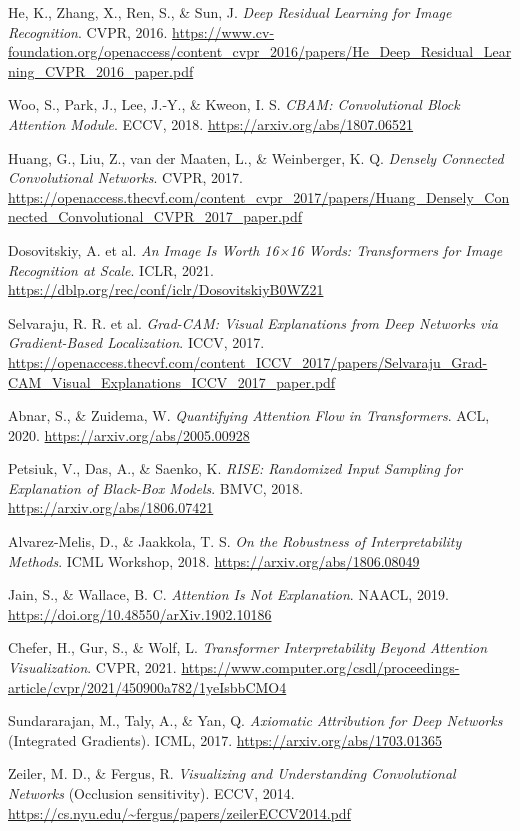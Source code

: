 \documentclass[11pt,a4paper]{article}
\begin{document}
\begin{list}{}{\setlength{\leftmargin}{2.5em}\setlength{\labelwidth}{2em}\setlength{\labelsep}{0.3em}\setlength{\itemsep}{0.2ex}}
\item[1.] He, K., Zhang, X., Ren, S., \& Sun, J. \emph{Deep Residual Learning for Image Recognition}. CVPR, 2016. \url{https://www.cv-foundation.org/openaccess/content_cvpr_2016/papers/He_Deep_Residual_Learning_CVPR_2016_paper.pdf}
\item[2.] Woo, S., Park, J., Lee, J.-Y., \& Kweon, I. S. \emph{CBAM: Convolutional Block Attention Module}. ECCV, 2018. \url{https://arxiv.org/abs/1807.06521}
\item[3.] Huang, G., Liu, Z., van der Maaten, L., \& Weinberger, K. Q. \emph{Densely Connected Convolutional Networks}. CVPR, 2017. \url{https://openaccess.thecvf.com/content_cvpr_2017/papers/Huang_Densely_Connected_Convolutional_CVPR_2017_paper.pdf}
\item[4.] Dosovitskiy, A. et al. \emph{An Image Is Worth 16×16 Words: Transformers for Image Recognition at Scale}. ICLR, 2021. \url{https://dblp.org/rec/conf/iclr/DosovitskiyB0WZ21}
\item[5.] Selvaraju, R. R. et al. \emph{Grad-CAM: Visual Explanations from Deep Networks via Gradient-Based Localization}. ICCV, 2017. \url{https://openaccess.thecvf.com/content_ICCV_2017/papers/Selvaraju_Grad-CAM_Visual_Explanations_ICCV_2017_paper.pdf}
\item[6.] Abnar, S., \& Zuidema, W. \emph{Quantifying Attention Flow in Transformers}. ACL, 2020. \url{https://arxiv.org/abs/2005.00928}
\item[7.] Petsiuk, V., Das, A., \& Saenko, K. \emph{RISE: Randomized Input Sampling for Explanation of Black-Box Models}. BMVC, 2018. \url{https://arxiv.org/abs/1806.07421}
\item[8.] Alvarez-Melis, D., \& Jaakkola, T. S. \emph{On the Robustness of Interpretability Methods}. ICML Workshop, 2018. \url{https://arxiv.org/abs/1806.08049}
\item[9.] Jain, S., \& Wallace, B. C. \emph{Attention Is Not Explanation}. NAACL, 2019. \url{https://doi.org/10.48550/arXiv.1902.10186}
\item[10.] Chefer, H., Gur, S., \& Wolf, L. \emph{Transformer Interpretability Beyond Attention Visualization}. CVPR, 2021. \url{https://www.computer.org/csdl/proceedings-article/cvpr/2021/450900a782/1yeIsbbCMO4}
\item[11.] Sundararajan, M., Taly, A., \& Yan, Q. \emph{Axiomatic Attribution for Deep Networks} (Integrated Gradients). ICML, 2017. \url{https://arxiv.org/abs/1703.01365}
\item[12.] Zeiler, M. D., \& Fergus, R. \emph{Visualizing and Understanding Convolutional Networks} (Occlusion sensitivity). ECCV, 2014. \url{https://cs.nyu.edu/~fergus/papers/zeilerECCV2014.pdf}
\end{list}
\end{document}
